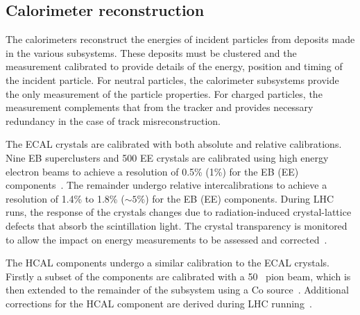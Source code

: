 \subsection{Calorimeter reconstruction}

The calorimeters reconstruct the energies of incident particles from deposits made in the 
various subsystems. These deposits must be clustered and the measurement calibrated to provide 
details of the energy, position and timing of the incident particle.
For neutral particles, the calorimeter subsystems provide the only measurement of
the particle properties. For charged particles, the measurement complements that
from the tracker and provides necessary redundancy in the case of track
misreconstruction.

The ECAL crystals are calibrated with both absolute and relative calibrations. Nine EB superclusters
and 500 EE crystals are calibrated using high energy electron beams to achieve a 
resolution of 0.5\% (1\%) for the EB (EE) components~\cite{ecal_performance2}. 
The remainder undergo relative intercalibrations to achieve a resolution of 1.4\% to 1.8\% ($\sim5\%$) 
for the EB (EE) components. During LHC runs, the response of the crystals changes due to 
radiation-induced crystal-lattice defects that absorb the scintillation light. 
The crystal transparency is monitored to allow the impact on energy measurements to
be assessed and corrected~\cite{ecal_performance2}. 

The HCAL components undergo a similar calibration to the ECAL crystals. Firstly a subset of the 
components are calibrated with a 50 \GeV~pion beam, which is then extended to the remainder of the 
subsystem using a Co source~\cite{hcal_performance}. Additional corrections
for the HCAL component are derived during LHC running~\cite{hcal_calib}.

%

